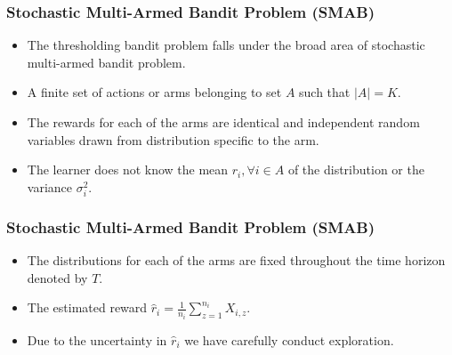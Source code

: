 \begin{frame}
\frametitle{Stochastic Multi-Armed Bandit Problem (SMAB)}
\begin{itemize}
\item<1-> The thresholding bandit problem falls under the broad area of stochastic multi-armed bandit problem.
\item<2-> A finite set of actions or arms belonging to set $A$ such that $|A|=K$. 
\item<3-> The rewards for each of the arms are identical and independent random variables drawn from distribution specific to the arm.
\item<4-> The learner does not know the mean $r_{i},\forall i\in A$ of the distribution or the variance $\sigma_i^2$. 
\end{itemize}
\end{frame}

\begin{frame}
\frametitle{Stochastic Multi-Armed Bandit Problem (SMAB)}
\begin{itemize}
\item<1-> The distributions for each of the arms are fixed throughout the time horizon denoted by $T$. 
\item<2-> The estimated reward $\hat{r}_{i}=\frac{1}{n_{i}}\sum_{z=1}^{n_i} X_{i,z}$.
\item<3-> Due to the uncertainty in $\hat{r}_i$ we have carefully conduct exploration.
\end{itemize}
\end{frame}



